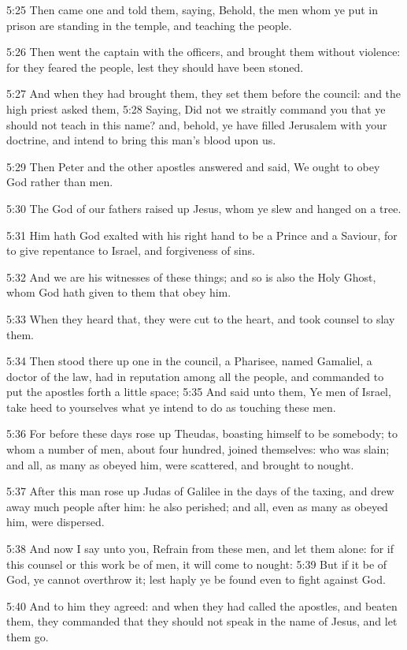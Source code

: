 5:25 Then came one and told them, saying, Behold, the men whom ye put
in prison are standing in the temple, and teaching the people.

5:26 Then went the captain with the officers, and brought them without
violence: for they feared the people, lest they should have been
stoned.

5:27 And when they had brought them, they set them before the council:
and the high priest asked them, 5:28 Saying, Did not we straitly
command you that ye should not teach in this name? and, behold, ye
have filled Jerusalem with your doctrine, and intend to bring this
man's blood upon us.

5:29 Then Peter and the other apostles answered and said, We ought to
obey God rather than men.

5:30 The God of our fathers raised up Jesus, whom ye slew and hanged
on a tree.

5:31 Him hath God exalted with his right hand to be a Prince and a
Saviour, for to give repentance to Israel, and forgiveness of sins.

5:32 And we are his witnesses of these things; and so is also the Holy
Ghost, whom God hath given to them that obey him.

5:33 When they heard that, they were cut to the heart, and took
counsel to slay them.

5:34 Then stood there up one in the council, a Pharisee, named
Gamaliel, a doctor of the law, had in reputation among all the people,
and commanded to put the apostles forth a little space; 5:35 And said
unto them, Ye men of Israel, take heed to yourselves what ye intend to
do as touching these men.

5:36 For before these days rose up Theudas, boasting himself to be
somebody; to whom a number of men, about four hundred, joined
themselves: who was slain; and all, as many as obeyed him, were
scattered, and brought to nought.

5:37 After this man rose up Judas of Galilee in the days of the
taxing, and drew away much people after him: he also perished; and
all, even as many as obeyed him, were dispersed.

5:38 And now I say unto you, Refrain from these men, and let them
alone: for if this counsel or this work be of men, it will come to
nought: 5:39 But if it be of God, ye cannot overthrow it; lest haply
ye be found even to fight against God.

5:40 And to him they agreed: and when they had called the apostles,
and beaten them, they commanded that they should not speak in the name
of Jesus, and let them go.


